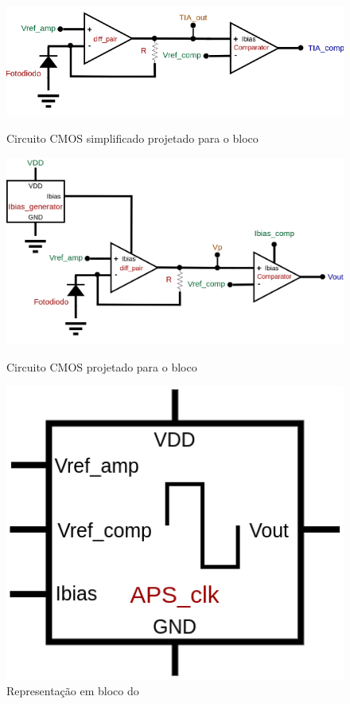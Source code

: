 \begin{figure}[!h]
 \centering
    \centering
    \caption{Circuito CMOS simplificado projetado para o bloco \NomeBloco} 
    \includegraphics[scale=0.6]{Circuitos/TIA_ref.png}
    \label{TIAsimplifC}
\end{figure}

\begin{figure}[!h]
 \centering
    \centering
    \caption{Circuito CMOS projetado para o bloco \NomeBloco} 
    \includegraphics[scale=0.3]{Circuitos/APS_clk.png}
    \label{\NomePFig}
\end{figure}

\begin{figure}[!h]
 \centering
    \centering
    \caption{\label{\NomeSFig}Representação em bloco do \NomeBloco}
    \includegraphics[scale=0.3]{Circuitos/APS_clk_block.png}
\end{figure}


